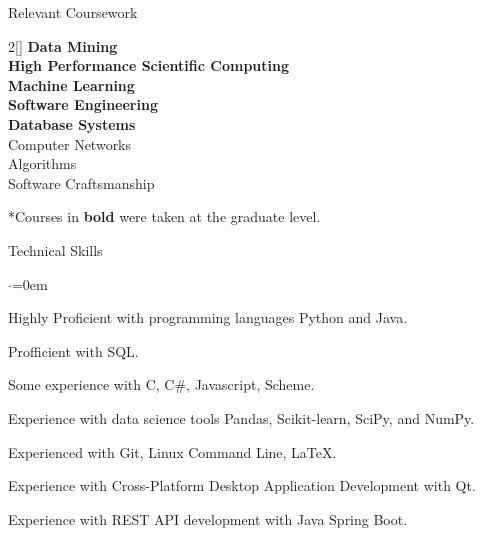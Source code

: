 \documentclass{resume} %
\begin{document}

\begin{rSection}{Relevant Coursework}
\begin{multicols}{2}[]
\textbf{Data Mining} \\
\textbf{High Performance Scientific Computing} \\
\textbf{Machine Learning} \\
\textbf{Software Engineering} \\ 
\textbf{Database Systems} \\
Computer Networks \\
Algorithms \\
Software Craftsmanship
\end{multicols}
\vspace{-1.0em}
*Courses in \textbf{bold} were taken at the graduate level.
\end{rSection}



\begin{rSection}{Technical Skills}
\begin{list}{$\cdot$}{\leftmargin=0em}
\item Highly Proficient with programming languages Python and Java.
\vspace{-0.5em}
\item Profficient with SQL.
\vspace{-0.5em}
\item Some experience with C, C\#, Javascript, Scheme.
\vspace{-0.5em}
\item Experience with data science tools Pandas, Scikit-learn, SciPy, and NumPy.
\vspace{-0.5em}
\item Experienced with Git, Linux Command Line, LaTeX.
\vspace{-0.5em}
\item Experience with Cross-Platform Desktop Application Development with Qt.
\vspace{-0.5em}
\item Experience with REST API development with Java Spring Boot.
\vspace{-0.5em}
\end{list}
\end{rSection}
\end{document}
